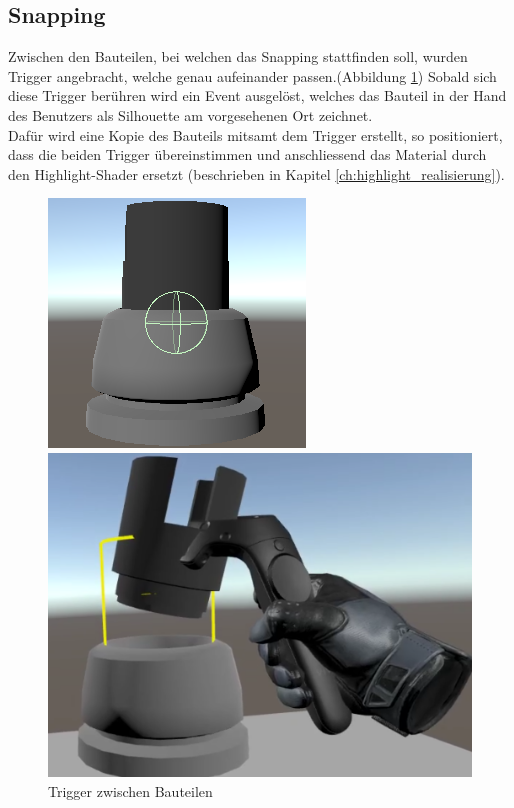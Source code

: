 \subsection{Snapping}
Zwischen den Bauteilen, bei welchen das Snapping stattfinden soll, wurden Trigger angebracht, welche genau aufeinander passen.(Abbildung \ref{fig:trigger_between_objects}) Sobald sich diese Trigger berühren wird ein Event ausgelöst, welches das Bauteil in der Hand des Benutzers als Silhouette am vorgesehenen Ort zeichnet. \\
Dafür wird eine Kopie des Bauteils mitsamt dem Trigger erstellt, so positioniert, dass die beiden Trigger übereinstimmen und anschliessend das Material durch den Highlight-Shader ersetzt (beschrieben in Kapitel \ref{ch:highlight_realisierung}).

\begin{figure}[h!]
	\centering
	\begin{minipage}[b]{0.49\linewidth}
		\centering
		\includegraphics[keepaspectratio,width=0.9\linewidth]{img/Trigger_Between_Objects.PNG}
		\caption{Trigger zwischen Bauteilen}
		\label{fig:trigger_between_objects}
	\end{minipage}
	\hfill
	\begin{minipage}[b]{0.49\linewidth}
		\centering
		\includegraphics[keepaspectratio,width=0.9\linewidth]{img/Snapping.PNG}

\end{minipage}
\end{figure}
